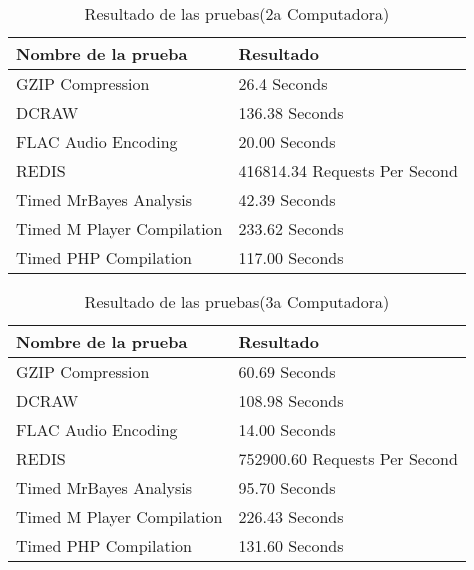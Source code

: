 \documentclass[12pt, letterpaper, twoside]{article}
\begin{document}
\begin{table}[H]
\begin{center}
\begin{tabular}{|l|l|}
\hline
Nombre de la prueba & Resultado \\
\hline \hline
GZIP Compression & 26.4 Seconds \\ \hline
DCRAW & 136.38 Seconds \\ \hline
FLAC Audio Encoding & 20.00 Seconds \\ \hline
REDIS & 416814.34 Requests Per Second \\ \hline
Timed MrBayes Analysis & 42.39 Seconds \\ \hline
Timed M Player Compilation & 233.62 Seconds \\ \hline
Timed PHP Compilation & 117.00 Seconds\\ \hline
\end{tabular}
\caption{Resultado de las pruebas(2a Computadora)}
\label{tabla:sencilla}
\end{center}
\end{table}

\begin{table}[H]
\begin{center}
\begin{tabular}{|l|l|}
\hline
Nombre de la prueba & Resultado \\
\hline \hline
GZIP Compression & 60.69 Seconds \\ \hline
DCRAW & 108.98 Seconds \\ \hline
FLAC Audio Encoding & 14.00 Seconds \\ \hline
REDIS & 752900.60 Requests Per Second \\ \hline
Timed MrBayes Analysis & 95.70 Seconds \\ \hline
Timed M Player Compilation & 226.43 Seconds \\ \hline
Timed PHP Compilation & 131.60 Seconds\\ \hline
\end{tabular}
\caption{Resultado de las pruebas(3a Computadora)}
\label{tabla:sencilla}
\end{center}
\end{table}
\end{document}
